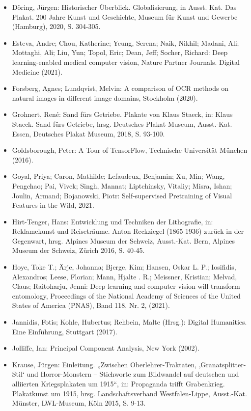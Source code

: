 \documentclass[a4paper,12pt,ngerman]{article}
\begin{document}
\begin{itemize}
	\item Döring, Jürgen: Historischer Überblick. Globalisierung, in Ausst. Kat. Das Plakat. 200 Jahre Kunst und Geschichte, Museum für Kunst und Gewerbe (Hamburg), 2020, S. 304-305.
	\item Esteva, Andre; Chou, Katherine; Yeung, Serena; Naik, Nikhil; Madani, Ali; Mottaghi, Ali; Liu, Yun; Topol, Eric; Dean, Jeff; Socher, Richard: Deep learning-enabled medical computer vision, Nature Partner Journals. Digital Medicine (2021). 
	\item Forsberg, Agnes; Lundqvist, Melvin: A comparison of OCR methods on natural images in different image domains, Stockholm (2020).
	\item Grohnert, René: Sand fürs Getriebe. Plakate von Klaus Staeck, in: Klaus Staeck. Sand fürs Getriebe, hrsg. Deutsches Plakat Museum, Ausst.-Kat. Essen, Deutsches Plakat Museum, 2018, S. 93-100.
	\item Goldsborough, Peter: A Tour of TensorFlow, Technische Universität München (2016).
	\item Goyal, Priya; Caron, Mathilde; Lefaudeux, Benjamin; Xu, Min; Wang, Pengchao; Pai, Vivek; Singh, Mannat; Liptchinsky, Vitaliy; Misra, Ishan; Joulin, Armand; Bojanowski, Piotr: Self-supervised Pretraining of Visual Features in the Wild, 2021. 
	\item Hirt-Tenger, Hans: Entwicklung und Techniken der Lithografie, in: Reklamekunst und Reiseträume. Anton Reckziegel (1865-1936) zurück in der Gegenwart, hrsg. Alpines Museum der Schweiz, Ausst.-Kat. Bern, Alpines Museum der Schweiz, Zürich 2016, S. 40-45.
	\item Hoye, Toke T.; Ärje, Johanna; Bjerge, Kim; Hansen, Oskar L. P.; Iosifidis, Alexandros; Leese, Florian; Mann, Hjalte . R.; Meissner, Kristian; Melvad, Claus; Raitoharju, Jenni: Deep learning and computer vision will transform entomology, Proceedings of the National Academy of Sciences of the United States of America (PNAS), Band 118, Nr. 2, (2021).
	\item Jannidis, Fotis; Kohle, Hubertus; Rehbein, Malte (Hrsg.): Digital Humanities. Eine Einführung, Stuttgart (2017).
	\item Jolliffe, Ian: Principal Component Analysis, New York (2002).
	\item Krause, Jürgen: Einleitung. „Zwischen Oberlehrer-Traktaten, ‚Granatsplitter-Stil‘ und Horror-Monstern -- Stichworte zum Bildwandel auf deutschen und alliierten Kriegsplakaten um 1915“, in: Propaganda trifft Grabenkrieg. Plakatkunst um 1915, hrsg. Landschaftsverband Westfalen-Lippe, Ausst.-Kat. Münster, LWL-Museum, Köln 2015, S. 9-13.

\end{itemize}
\end{document}
